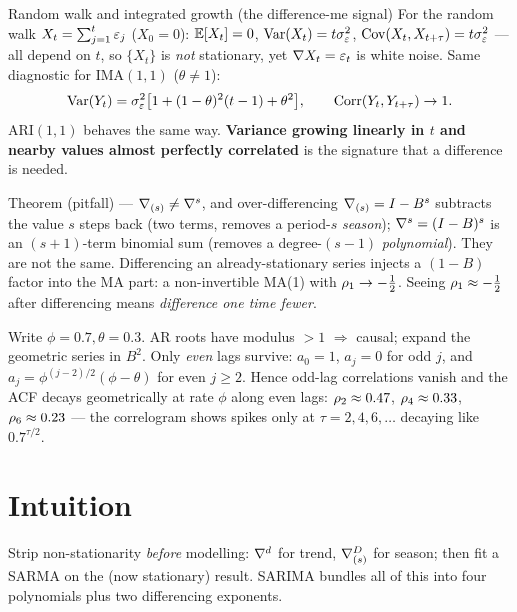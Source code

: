 \documentclass[11pt]{article}
\begin{document}
\begin{result}{Random walk and integrated growth (the difference-me signal)}
For the random walk $X_t=\sum_{j=1}^{t}\varepsilon_j$ ($X_0=0$): $\mathbb{E}[X_t]=0$, $\operatorname{Var}(X_t)=t\sigma_\varepsilon^2$, $\operatorname{Cov}(X_t,X_{t+\tau})=t\sigma_\varepsilon^2$ --- all depend on $t$, so $\{X_t\}$ is \emph{not} stationary, yet $\nabla X_t=\varepsilon_t$ is white noise. Same diagnostic for IMA$(1,1)$ ($\theta\neq1$):
\[
\operatorname{Var}(Y_t)=\sigma_\varepsilon^2\bigl[1+(1-\theta)^{2}(t-1)+\theta^{2}\bigr],\qquad \operatorname{Corr}(Y_t,Y_{t+\tau})\to1.
\]
ARI$(1,1)$ behaves the same way. \textbf{Variance growing linearly in $t$ and nearby values almost perfectly correlated} is the signature that a difference is needed.
\end{result}

\begin{result}{Theorem (pitfall) --- $\nabla_{(s)}\neq\nabla^{s}$, and over-differencing}
$\nabla_{(s)}=I-B^{s}$ subtracts the value $s$ steps back (two terms, removes a period-$s$ \emph{season}); $\nabla^{s}=(I-B)^{s}$ is an $(s+1)$-term binomial sum (removes a degree-$(s-1)$ \emph{polynomial}). They are not the same. Differencing an already-stationary series injects a $(1-B)$ factor into the MA part: a non-invertible MA(1) with $\rho_1\to-\tfrac12$. Seeing $\rho_1\approx-\tfrac12$ after differencing means \emph{difference one time fewer}.
\end{result}

\begin{exmpl}[Seasonal ARMA $(1-0.7B^{2})X_t=(1-0.3B^{2})\eps_t$]
Write $\phi=0.7,\theta=0.3$. AR roots have modulus $>1$ $\Rightarrow$ causal; expand the geometric series in $B^{2}$. Only \emph{even} lags survive: $a_0=1$, $a_j=0$ for odd $j$, and $a_j=\phi^{(j-2)/2}(\phi-\theta)$ for even $j\ge2$. Hence odd-lag correlations vanish and the ACF decays geometrically at rate $\phi$ along even lags: $\rho_2\approx0.47$, $\rho_4\approx0.33$, $\rho_6\approx0.23$ --- the correlogram shows spikes only at $\tau=2,4,6,\dots$ decaying like $0.7^{\tau/2}$.
\end{exmpl}

\section*{Intuition}

\begin{intu}
Strip non-stationarity \emph{before} modelling: $\nabla^{d}$ for trend, $\nabla_{(s)}^{D}$ for season; then fit a SARMA on the (now stationary) result. SARIMA bundles all of this into four polynomials plus two differencing exponents.
\end{intu}
\end{document}

